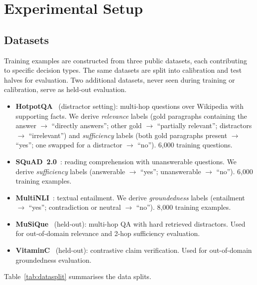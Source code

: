 \documentclass[twocolumn]{ICCKjournal}
\begin{document}
\section{Experimental Setup}
\label{sec:experiments}

\subsection{Datasets}
\label{sec:datasets}
Training examples are constructed from three public datasets, each contributing to specific decision types. The same datasets are split into calibration and test halves for evaluation. Two additional datasets, never seen during training or calibration, serve as held-out evaluation.

\begin{itemize}[leftmargin=*]
    \item \textbf{HotpotQA}~\cite{yang2018hotpotqa} (distractor setting): multi-hop questions over Wikipedia with supporting facts. We derive \emph{relevance} labels (gold paragraphs containing the answer $\to$ ``directly answers''; other gold $\to$ ``partially relevant''; distractors $\to$ ``irrelevant'') and \emph{sufficiency} labels (both gold paragraphs present $\to$ ``yes''; one swapped for a distractor $\to$ ``no''). 6,000 training questions.
    \item \textbf{SQuAD~2.0}~\cite{rajpurkar2018squad2}: reading comprehension with unanswerable questions. We derive \emph{sufficiency} labels (answerable $\to$ ``yes''; unanswerable $\to$ ``no''). 6,000 training examples.
    \item \textbf{MultiNLI}~\cite{williams2018multinli}: textual entailment. We derive \emph{groundedness} labels (entailment $\to$ ``yes''; contradiction or neutral $\to$ ``no''). 8,000 training examples.
    \item \textbf{MuSiQue}~\cite{trivedi2022musique} (held-out): multi-hop QA with hard retrieved distractors. Used for out-of-domain relevance and 2-hop sufficiency evaluation.
    \item \textbf{VitaminC}~\cite{schuster2021vitaminc} (held-out): contrastive claim verification. Used for out-of-domain groundedness evaluation.
\end{itemize}

Table~\ref{tab:datasplit} summarises the data splits.
\end{document}
